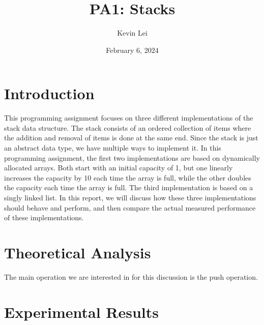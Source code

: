 \documentclass{article}
\title{PA1: Stacks}
\author{Kevin Lei}
\date{February 6, 2024}
\begin{document}
\maketitle

\section{Introduction}

This programming assignment focuses on three different implementations of the stack data structure. 
The stack consists of an ordered collection of items where the addition and removal of items is done at the same end.
Since the stack is just an abstract data type, we have multiple ways to implement it.
In this programming assignment, the first two implementations are based on dynamically allocated arrays. 
Both start with an initial capacity of 1, but one linearly increases the capacity by 10 each time the array is full, while the other doubles the capacity each time the array is full.
The third implementation is based on a singly linked list.
In this report, we will discuss how these three implementations should behave and perform, and then compare the actual measured performance of these implementations.

\section{Theoretical Analysis}

The main operation we are interested in for this discussion is the push operation. 


\section{Experimental Results}
\end{document}
